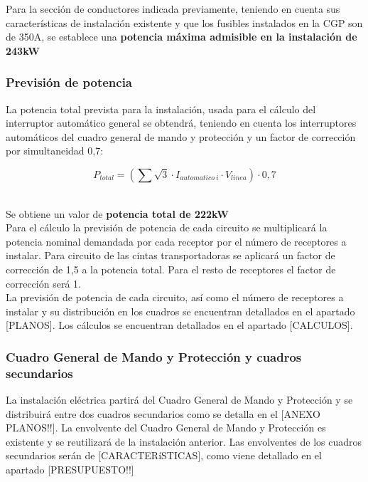 Para la sección de conductores indicada previamente, teniendo en cuenta sus características de instalación existente y que los fusibles instalados en la CGP son de 350A, se establece una {\bfseries potencia máxima admisible en la instalación de 243kW}

\subsubsection{Previsión de potencia}

La potencia total prevista para la instalación, usada para el cálculo del interruptor automático general se obtendrá, teniendo en cuenta los interruptores automáticos del cuadro general de mando y protección y un factor de corrección por simultaneidad 0,7:

$$P_{total}=\left( \sum \sqrt 3 \cdot I_{automatico\ i}\cdot  {V_{linea}}\right)\cdot 0,7$$\

Se obtiene un valor de {\bfseries potencia total de 222kW}\\

Para el cálculo la previsión de potencia de cada circuito se multiplicará la potencia nominal demandada por cada receptor por el número de receptores a instalar. Para circuito de las cintas transportadoras se aplicará un factor de corrección de 1,5 a la potencia total. Para el resto de receptores el factor de corrección será 1. \\

La previsión de potencia de cada circuito, así como el número de receptores a instalar y su distribución en los cuadros se encuentran detallados en el apartado [PLANOS]. Los cálculos se encuentran detallados en el apartado [CALCULOS]. 

\subsubsection{Cuadro General de Mando y Protección y cuadros secundarios}

La instalación eléctrica partirá del Cuadro General de Mando y Protección y se distribuirá entre dos cuadros secundarios como se detalla en el [ANEXO PLANOS!!]. La envolvente del Cuadro General de Mando y Protección es existente y se reutilizará de la instalación anterior. Las envolventes de los cuadros secundarios serán de [CARACTERíSTICAS], como viene detallado en el apartado [PRESUPUESTO!!]\\

